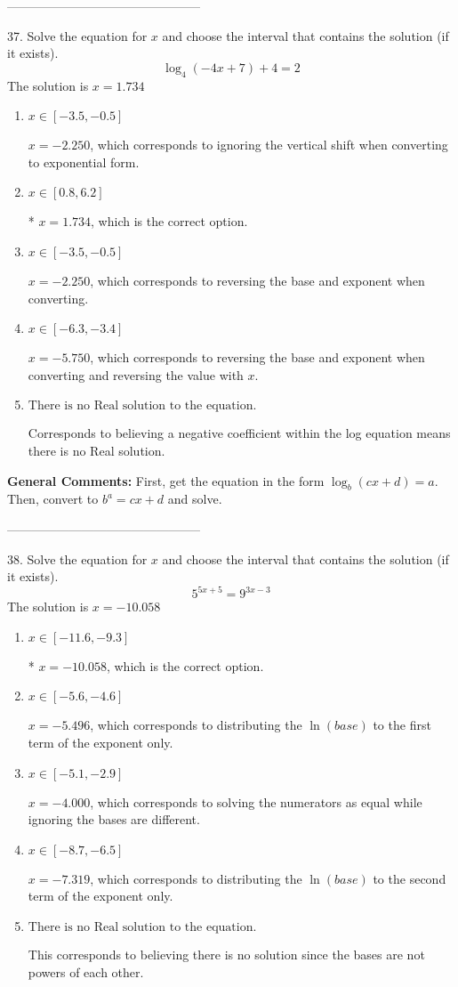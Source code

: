 \documentclass{extbook}[14pt]
\begin{document}
-----------------------------------------------

37. Solve the equation for $x$ and choose the interval that contains the solution (if it exists).
\[ \log_{4}{(-4x+7)}+4 = 2 \] 
The solution is $ x = 1.734 $ 

\begin{enumerate}[label=\Alph*.] 
\item $ x \in [-3.5, -0.5] $ 

 $x = -2.250$, which corresponds to ignoring the vertical shift when converting to exponential form. 
\item $ x \in [0.8, 6.2] $ 

 * $x = 1.734$, which is the correct option. 
\item $ x \in [-3.5, -0.5] $ 

 $x = -2.250$, which corresponds to reversing the base and exponent when converting. 
\item $ x \in [-6.3, -3.4] $ 

 $x = -5.750$, which corresponds to reversing the base and exponent when converting and reversing the value with $x$. 
\item $ \text{There is no Real solution to the equation.} $ 

 Corresponds to believing a negative coefficient within the log equation means there is no Real solution. 
\end{enumerate} 
 
\textbf{General Comments:} First, get the equation in the form $\log_b{(cx+d)} = a$. Then, convert to $b^a = cx+d$ and solve.

-----------------------------------------------

38. Solve the equation for $x$ and choose the interval that contains the solution (if it exists).
\[ 5^{5x+5} = 9^{3x-3} \] 
The solution is $ x = -10.058 $ 

\begin{enumerate}[label=\Alph*.] 
\item $ x \in [-11.6, -9.3] $ 

 * $x = -10.058$, which is the correct option. 
\item $ x \in [-5.6, -4.6] $ 

 $x = -5.496$, which corresponds to distributing the $\ln(base)$ to the first term of the exponent only. 
\item $ x \in [-5.1, -2.9] $ 

 $x = -4.000$, which corresponds to solving the numerators as equal while ignoring the bases are different. 
\item $ x \in [-8.7, -6.5] $ 

 $x = -7.319$, which corresponds to distributing the $\ln(base)$ to the second term of the exponent only. 
\item $ \text{There is no Real solution to the equation.} $ 

 This corresponds to believing there is no solution since the bases are not powers of each other. 
\end{enumerate} 
 
\end{document}
